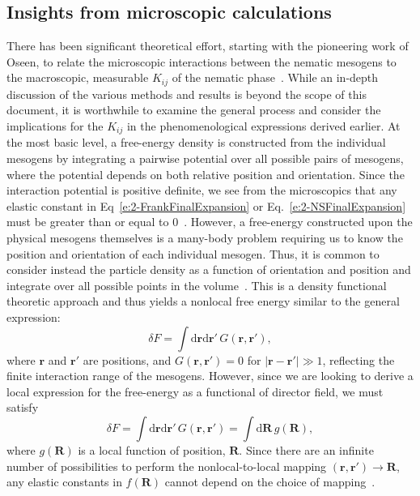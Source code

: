 \subsection{Insights from microscopic calculations}
There has been significant theoretical effort, starting with the pioneering work of Oseen, to relate the microscopic interactions between the nematic mesogens to the macroscopic, measurable $K_{ij}$ of the nematic phase~\cite{RN56,RN55}.
While an in-depth discussion of the various methods and results is beyond the scope of this document, it is worthwhile to examine the general process and consider the implications for the $K_{ij}$ in the phenomenological expressions derived earlier.
At the most basic level, a free-energy density is constructed from the individual mesogens by integrating a pairwise potential over all possible pairs of mesogens, where the potential depends on both relative position and orientation.
Since the interaction potential is positive definite, we see from the microscopics that any elastic constant in Eq~\ref{e:2-FrankFinalExpansion} or Eq.~\ref{e:2-NSFinalExpansion} must be greater than or equal to 0~.
However, a free-energy constructed upon the physical mesogens themselves is a many-body problem requiring us to know the position and orientation of each individual mesogen.
Thus, it is common to consider instead the particle density as a function of orientation and position and integrate over all possible points in the volume~\cite{RN55}.
This is a density functional theoretic approach and thus yields a nonlocal free energy similar to the general expression:
\begin{equation}
  \delta F = \int \textrm{d}\mathbf{r} \textrm{d}\mathbf{r}' \, G(\mathbf{r},\mathbf{r}'),
\end{equation}
where $\mathbf{r}$ and $\mathbf{r}'$ are positions, and $G(\mathbf{r},\mathbf{r}') = 0$ for $|\mathbf{r}-\mathbf{r}'| \gg 1$, reflecting the finite interaction range of the mesogens.
However, since we are looking to derive a local expression for the free-energy as a functional of director field, we must satisfy
\begin{equation}
  \delta F = \int \textrm{d}\mathbf{r} \textrm{d}\mathbf{r}' \, G(\mathbf{r},\mathbf{r}')
  = \int \textrm{d} \mathbf{R} \, g(\mathbf{R}),\label{e:2-NonlocalLocal}
\end{equation}
where $g(\mathbf{R})$ is a local function of position, $\mathbf{R}$.
Since there are an infinite number of possibilities to perform the nonlocal-to-local mapping $(\mathbf{r},\mathbf{r}') \rightarrow \mathbf{R}$, any elastic constants in $f(\mathbf{R})$ cannot depend on the choice of mapping~\cite{RN55}.
